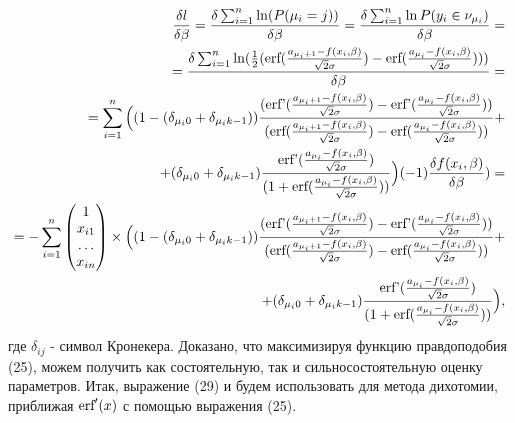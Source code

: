 \documentclass[12pt]{article}
\begin{document}
\begin{eqnarray}
    \frac{\delta l}{\delta \beta}=\frac{\delta \sum_{i=1}^{n}\ln(P(\mu_i=j))}{\delta \beta}=\frac{\delta \sum_{i=1}^{n}\ln P(y_i\in \nu_{\mu_i})}{\delta \beta}=\\
    =\frac{\delta \sum_{i=1}^{n} \ln(\frac{1}{2}(\textup{erf}(\frac{a_{\mu_i+1}-f(x_i,\beta)}{\sqrt{2}\sigma})-\textup{erf}(\frac{a_{\mu_i}-f(x_i,\beta)}{\sqrt{2}\sigma})) )         }{\delta \beta}=\\
    =  \sum_{i=1}^{n}\Big((1-(\delta_{\mu_i 0}+\delta_{\mu_i k-1}))\frac{(\textup{erf'}(\frac{a_{\mu_i+1}-f(x_i,\beta)}{\sqrt{2}\sigma})-\textup{erf'}(\frac{a_{\mu_i}-f(x_i,\beta)}{\sqrt{2}\sigma}))}{ (\textup{erf}(\frac{a_{\mu_i+1}-f(x_i,\beta)}{\sqrt{2}\sigma})-\textup{erf}(\frac{a_{\mu_i}-f(x_i,\beta)}{\sqrt{2}\sigma}))}+\\
    \nonumber +(\delta_{\mu_i 0}+\delta_{\mu_i k-1})\frac{\textup{erf'}(\frac{a_{\mu_i}-f(x_i,\beta)}{\sqrt{2}\sigma})}{(1+\textup{erf}(\frac{a_{\mu_i}-f(x_i,\beta)}{\sqrt{2}\sigma}))}\Big)  (-1) \frac{\delta f(x_i,\beta)}{\delta \beta} )=\\
    =-\sum_{i=1}^{n}\begin{pmatrix}
        1\\
        x_{i1}\\
        \dots\\
        x_{in}
    \end{pmatrix}\times  \Big((1-(\delta_{\mu_i 0}+\delta_{\mu_i k-1}))\frac{(\textup{erf'}(\frac{a_{\mu_i+1}-f(x_i,\beta)}{\sqrt{2}\sigma})-\textup{erf'}(\frac{a_{\mu_i}-f(x_i,\beta)}{\sqrt{2}\sigma}))}{ (\textup{erf}(\frac{a_{\mu_i+1}-f(x_i,\beta)}{\sqrt{2}\sigma})-\textup{erf}(\frac{a_{\mu_i}-f(x_i,\beta)}{\sqrt{2}\sigma}))}+\\
    \nonumber +(\delta_{\mu_i 0}+\delta_{\mu_i k-1})\frac{\textup{erf'}(\frac{a_{\mu_i}-f(x_i,\beta)}{\sqrt{2}\sigma})}{(1+\textup{erf}(\frac{a_{\mu_i}-f(x_i,\beta)}{\sqrt{2}\sigma}))}\Big)  ,
\end{eqnarray}
где $\delta_{ij}$ - символ Кронекера.\hfill\break
Доказано, что максимизируя функцию правдоподобия (25), можем получить как состоятельную, так и сильносостоятельную оценку\cite{OLSforGrouping} параметров. \hfill\break
Итак, выражение (29) и будем использовать для метода дихотомии, приближая $\textup{erf}'(x)$ с помощью выражения (25).
\end{document}

